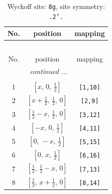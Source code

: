 \documentclass[fleqn,8pt]{jsarticle}
\begin{document}
\renewcommand{\arraystretch}{1.2}
\begin{longtable}{ccc}
\caption{Wyckoff site: {\tt 8g}, site symmetry: {\tt .2'.}}
 \\
 \hline \hline
No. & position & mapping \\ \hline \endfirsthead

\multicolumn{2}{l}{\tablename\ \thetable{}} \\
 \hline \hline
No. & position & mapping \\ \hline \endhead

 \hline \hline
\multicolumn{2}{r}{\footnotesize\it continued ...} \\ \endfoot

 \hline \hline
\multicolumn{2}{r}{} \\ \endlastfoot

1 & $\left[ x,\, 0,\, \frac{1}{2} \right]$ & {\tt [1,10]} \\ \hline
2 & $\left[ x + \frac{1}{2},\, \frac{1}{2},\, 0 \right]$ & {\tt [2,9]} \\ \hline
3 & $\left[ \frac{1}{2} - x,\, \frac{1}{2},\, 0 \right]$ & {\tt [3,12]} \\ \hline
4 & $\left[ - x,\, 0,\, \frac{1}{2} \right]$ & {\tt [4,11]} \\ \hline
5 & $\left[ 0,\, - x,\, \frac{1}{2} \right]$ & {\tt [5,15]} \\ \hline
6 & $\left[ 0,\, x,\, \frac{1}{2} \right]$ & {\tt [6,16]} \\ \hline
7 & $\left[ \frac{1}{2},\, \frac{1}{2} - x,\, 0 \right]$ & {\tt [7,13]} \\ \hline
8 & $\left[ \frac{1}{2},\, x + \frac{1}{2},\, 0 \right]$ & {\tt [8,14]} \\
\end{longtable}
\renewcommand{\arraystretch}{1.2}
\end{document}
